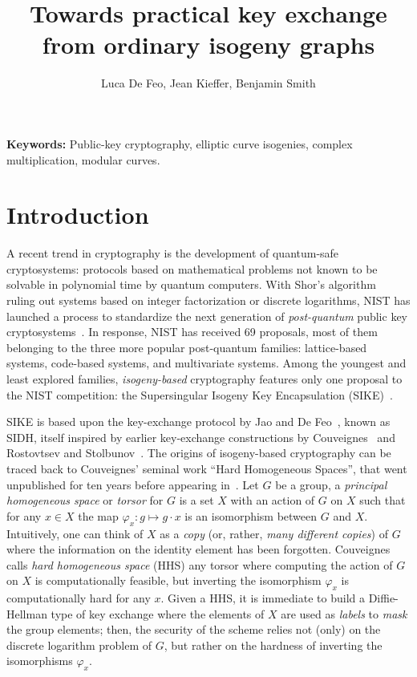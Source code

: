 \documentclass{article}
\title{Towards practical key exchange from ordinary isogeny graphs}
\author{Luca De Feo, Jean Kieffer, Benjamin Smith}
\theoremstyle{definition}
\begin{document}
\maketitle

\begin{abstract}
\end{abstract}

\textbf{Keywords:} Public-key cryptography, elliptic curve isogenies,
complex multiplication, modular curves.

\section{Introduction}
\label{sec:introduction}

A recent trend in cryptography is the development of quantum-safe
cryptosystems: protocols based on mathematical problems not known to
be solvable in polynomial time by quantum computers. With Shor's
algorithm~\cite{shor1994algorithms} ruling out systems based on
integer factorization or discrete logarithms, NIST has launched a
process to standardize the next generation of \emph{post-quantum}
public key cryptosystems~\cite{NIST2016}. In response, NIST has
received 69 proposals, most of them belonging to the three more
popular post-quantum families: lattice-based systems, code-based
systems, and multivariate systems. Among the youngest and least
explored families, \emph{isogeny-based} cryptography features only one
proposal to the NIST competition: the Supersingular Isogeny Key
Encapsulation (SIKE)~\cite{SIKE}.

SIKE is based upon the key-exchange protocol by Jao and De
Feo~\cite{jao+defeo2011}, known as SIDH, itself inspired by earlier
key-exchange constructions by Couveignes~\cite{cryptoeprint:2006:291}
and Rostovtsev and
Stolbunov~\cite{rostovtsev+stolbunov06,stolbunov-red,Stol}. The
origins of isogeny-based cryptography can be traced back to
Couveignes' seminal work ``Hard Homogeneous Spaces'', that went
unpublished for ten years before appearing
in~\cite{cryptoeprint:2006:291}. Let $G$ be a group, a \emph{principal
  homogeneous space} or \emph{torsor} for $G$ is a set $X$ with an
action of $G$ on $X$ such that for any $x∈X$ the map $φ_x:g↦g·x$ is an
isomorphism between $G$ and $X$. Intuitively, one can think of $X$ as
a \emph{copy} (or, rather, \emph{many different copies}) of $G$ where
the information on the identity element has been forgotten. Couveignes
calls \emph{hard homogeneous space} (HHS) any torsor where computing
the action of $G$ on $X$ is computationally feasible, but inverting
the isomorphism $φ_x$ is computationally hard for any $x$. Given a
HHS, it is immediate to build a Diffie-Hellman type of key exchange
where the elements of $X$ are used as \emph{labels} to \emph{mask} the
group elements; then, the security of the scheme relies not (only) on
the discrete logarithm problem of $G$, but rather on the hardness of
inverting the isomorphisms $φ_x$.
\end{document}

